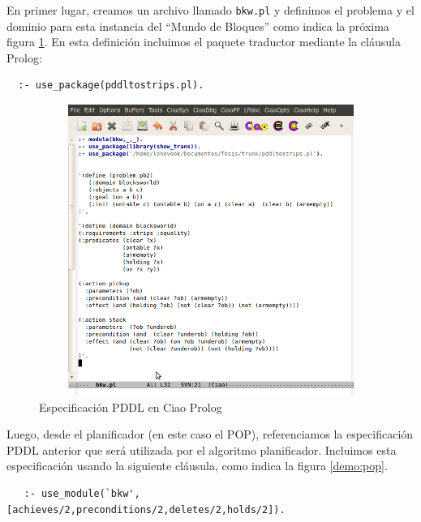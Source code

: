   En primer lugar, creamos un archivo llamado \texttt{bkw.pl} y
  definimos el problema y el dominio para esta instancia del ``Mundo de Bloques'' 
  como indica la pr\'oxima figura \ref{demo:pddl}. En esta definici\'on
  incluimos el paquete traductor
  mediante la cl\'ausula Prolog:

  \begin{verbatim}
  :- use_package(pddltostrips.pl).
  \end{verbatim}

  \begin{figure}[h!]
  \centering
  \includegraphics[width=12cm,height=9.5cm]{demoPddlCiao.png} 
       \caption{Especificaci\'on PDDL en Ciao Prolog}
	\label{demo:pddl}
   \end{figure} 

   Luego, desde el planificador (en este caso el POP), referenciamos la especificaci\'on
   PDDL anterior que ser\'a utilizada por el algoritmo
   planificador. Incluimos esta especificaci\'on usando la siguiente
   cl\'ausula, como indica la figura \ref{demo:pop}. 
   
   \begin{verbatim}
   :- use_module(`bkw',[achieves/2,preconditions/2,deletes/2,holds/2]).
   \end{verbatim}   

